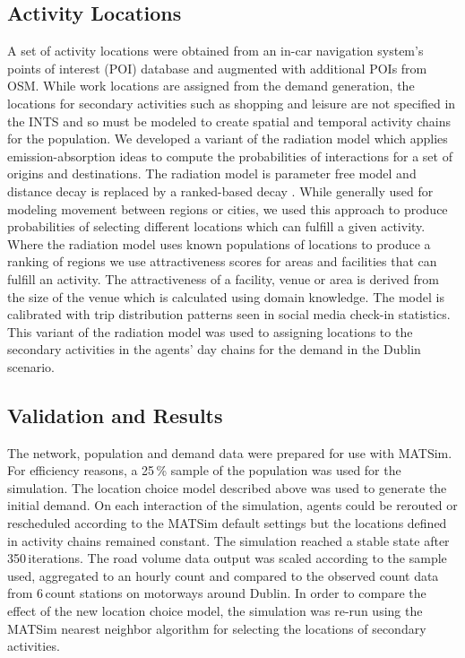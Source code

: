 \subsection{Activity Locations}
A set of activity locations were obtained from an in-car navigation system’s points of interest (POI) database and augmented with additional POIs from OSM. While work locations are assigned from the demand generation, the locations for secondary activities such as shopping and leisure are not specified in the INTS and so must be modeled to create spatial and temporal activity chains for the population. We developed a variant of the radiation model which applies emission-absorption ideas to compute the probabilities of interactions for a set of origins and destinations. The radiation model is parameter free model and distance decay is replaced by a ranked-based decay \citep[][]{SiminiEtAl_NAT_2012}. While generally used for modeling movement between regions or cities, we used this approach to produce probabilities of selecting different locations which can fulfill a given activity. Where the radiation model uses known populations of locations to produce a ranking of regions we use attractiveness scores for areas and facilities that can fulfill an activity. The attractiveness of a facility, venue or area is derived from the size of the venue which is calculated using domain knowledge. The model is calibrated with trip distribution patterns seen in social media check-in statistics. This variant of the radiation model was used to assigning locations to the secondary activities in the agents’ day chains for the demand in the Dublin scenario.

\subsection{Validation and Results}
The network, population and demand data were prepared for use with MATSim. For efficiency reasons, a 25\,\% sample of the population was used for the simulation. The location choice model described above was used to generate the initial demand. On each interaction of the simulation, agents could be rerouted or rescheduled according to the MATSim default settings but the locations defined in activity chains remained constant. The simulation reached a stable state after 350\,iterations. The road volume data output was scaled according to the sample used, aggregated to an hourly count and compared to the observed count data from 6\,count stations on motorways around Dublin. In order to compare the effect of the new location choice model, the simulation was re-run using the MATSim nearest neighbor algorithm for selecting the locations of secondary activities.

